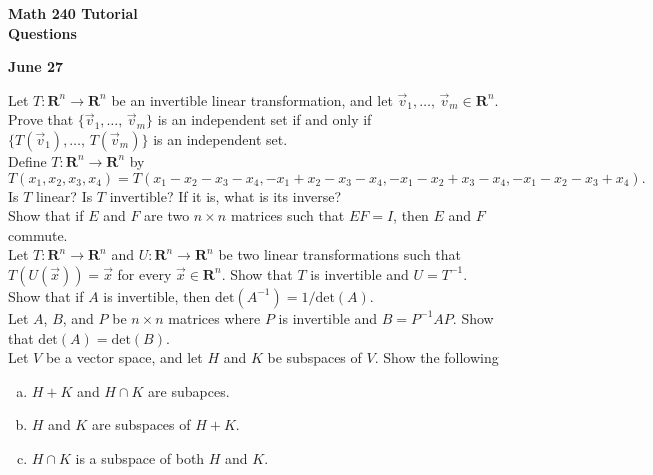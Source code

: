 \documentclass[a4paper,11pt]{article}
\newcommand{\R}{\mathbf{R}}
\begin{document}
\begin{center}
  {\Large\bfseries Math 240 Tutorial \\ Questions}
\end{center}
\begin{center}
  {\bfseries June 27}
\end{center}

 Let $T : \R^n \rightarrow \R^n$ be an invertible
linear transformation, and let $\vec v_1,\dots,\,\vec v_m \in \R^n$. Prove
that $\{\vec v_1,\dots,\,\vec v_m\}$ is an independent set if and only if
$\{T(\vec v_1),\dots,\,T(\vec v_m)\}$ is an independent set. \\

 Define $T : \R^n \rightarrow \R^n$ by
\[
  T(x_1,x_2,x_3,x_4) =
  T(x_1-x_2-x_3-x_4, -x_1+x_2-x_3-x_4,-x_1-x_2+x_3-x_4,-x_1-x_2-x_3+x_4).
\]
Is $T$ linear? Is $T$ invertible? If it is, what is its inverse? \\

 Show that if $E$ and $F$ are two $n \times n$
matrices such that $EF=I$, then $E$ and $F$ commute.  \\

 Let $T : \R^n \rightarrow \R^n$ and $U : \R^n
\rightarrow \R^n$ be two linear transformations such that $T(U(\vec x))=\vec x$
for every $\vec x \in \R^n$. Show that $T$ is invertible and $U=T^{-1}$. \\

 Show that if $A$ is invertible, then
$\text{det}(A^{-1}) = 1/\text{det}(A)$. \\

 Let $A$, $B$, and $P$ be $n \times n$ matrices
where $P$ is invertible and $B = P^{-1}AP$. Show that
$\text{det}(A)=\text{det}(B)$.  \\

 Let $V$ be a vector space, and let $H$ and $K$ be
subspaces of $V$. Show the following
\begin{enumerate}[(a)]
\item $H+K$ and $H \cap K$ are subapces.
\item $H$ and $K$ are subspaces of $H+K$.
\item $H \cap K$ is a subspace of both $H$ and $K$. \\
\end{enumerate}
\end{document}
